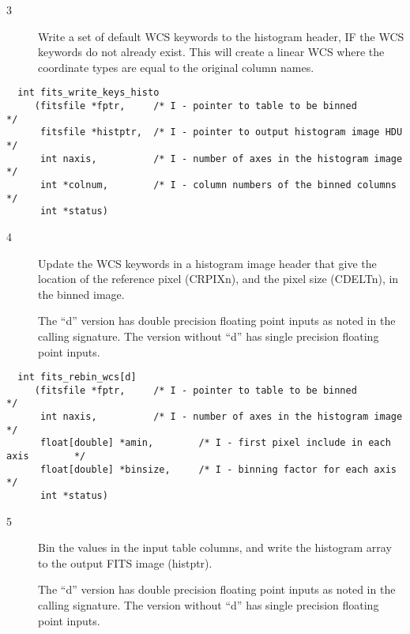 \documentclass[11pt]{book}
\begin{document}
\begin{description}
\item[3 ] Write a set of default WCS keywords to the histogram header, IF the
WCS keywords do not already exist.  This will create a linear WCS where
the coordinate types are equal to the original column names.
 \label{writekeyshisto}
\end{description}

\begin{verbatim}
  int fits_write_keys_histo
     (fitsfile *fptr,     /* I - pointer to table to be binned              */
      fitsfile *histptr,  /* I - pointer to output histogram image HDU      */
      int naxis,          /* I - number of axes in the histogram image      */
      int *colnum,        /* I - column numbers of the binned columns       */
      int *status)
\end{verbatim}


\begin{description}
\item[4 ] Update the WCS keywords in a histogram image header that give the location
of the reference pixel (CRPIXn), and the pixel size (CDELTn), in the binned
image.

The ``d'' version has double precision floating point inputs as noted
in the calling signature.  The version without ``d'' has single
precision floating point inputs.

 \label{rebinwcs}
\end{description}

\begin{verbatim}
  int fits_rebin_wcs[d]
     (fitsfile *fptr,     /* I - pointer to table to be binned           */
      int naxis,          /* I - number of axes in the histogram image   */
      float[double] *amin,        /* I - first pixel include in each axis        */
      float[double] *binsize,     /* I - binning factor for each axis            */
      int *status)
\end{verbatim}


\begin{description}
\item[5 ] Bin the values in the input table columns, and write the histogram
array to the output FITS image (histptr).

The ``d'' version has double precision floating point inputs as noted
in the calling signature.  The version without ``d'' has single
precision floating point inputs.
 \label{makehist}
\end{description}
\end{document}
